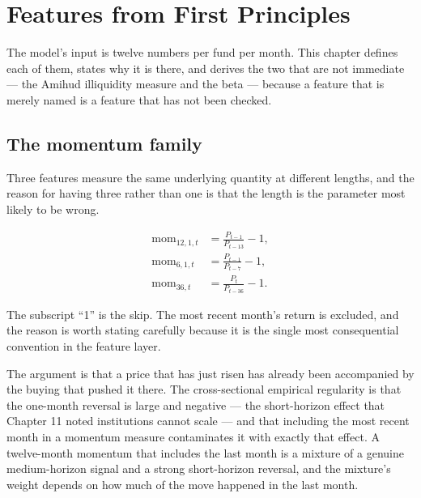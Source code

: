 
\chapter{Features from First Principles}
\label{ch:features}

The model's input is twelve numbers per fund per month. This chapter defines
each of them, states why it is there, and derives the two that are not
immediate --- the Amihud illiquidity measure and the beta --- because a
feature that is merely named is a feature that has not been checked.

\section{The momentum family}

Three features measure the same underlying quantity at different lengths,
and the reason for having three rather than one is that the length is the
parameter most likely to be wrong.

\[
\begin{aligned}
\mathrm{mom}_{12,1,t} &= \frac{P_{t-1}}{P_{t-13}} - 1, \\
\mathrm{mom}_{6,1,t}  &= \frac{P_{t-1}}{P_{t-7}} - 1, \\
\mathrm{mom}_{36,t}    &= \frac{P_t}{P_{t-36}} - 1.
\end{aligned}
\]

The subscript ``1'' is the skip. The most recent month's return is
excluded, and the reason is worth stating carefully because it is the
single most consequential convention in the feature layer.

The argument is that a price that has just risen has already been
accompanied by the buying that pushed it there. The cross-sectional
empirical regularity is that the one-month reversal is large and negative
--- the short-horizon effect that Chapter 11 noted institutions cannot
scale --- and that including the most recent month in a momentum measure
contaminates it with exactly that effect. A twelve-month momentum that
includes the last month is a mixture of a genuine medium-horizon signal
and a strong short-horizon reversal, and the mixture's weight depends on
how much of the move happened in the last month.

